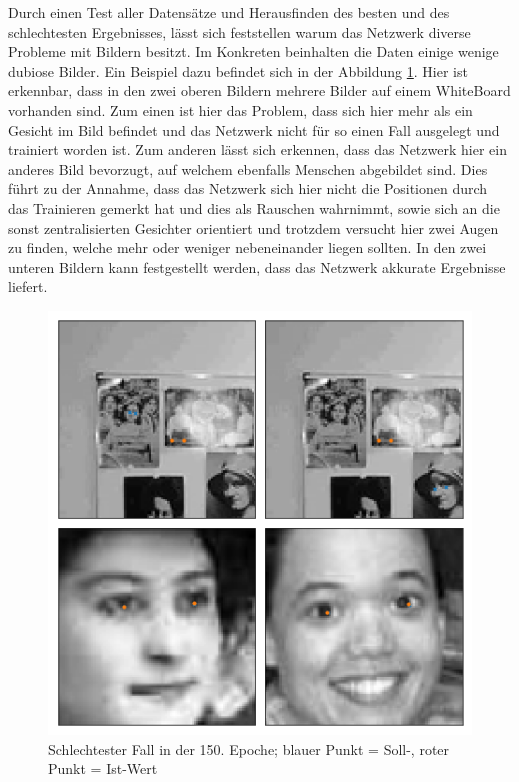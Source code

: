\noindent
Durch einen Test aller Datensätze und Herausfinden des besten und des schlechtesten Ergebnisses, lässt sich feststellen warum das Netzwerk diverse Probleme mit Bildern besitzt. 
Im Konkreten beinhalten die Daten einige wenige dubiose Bilder. 
Ein Beispiel dazu befindet sich in der Abbildung \ref{fig:dubio}. 
Hier ist erkennbar, dass in den zwei oberen Bildern mehrere Bilder auf einem WhiteBoard vorhanden sind. 
Zum einen ist hier das Problem, dass sich hier mehr als ein Gesicht im Bild befindet und das Netzwerk nicht für so einen Fall ausgelegt und trainiert worden ist. 
Zum anderen lässt sich erkennen, dass das Netzwerk hier ein anderes Bild bevorzugt, auf welchem ebenfalls Menschen abgebildet sind. 
Dies führt zu der Annahme, dass das Netzwerk sich hier nicht die Positionen durch das Trainieren gemerkt hat und dies als Rauschen wahrnimmt, sowie sich an die sonst zentralisierten Gesichter orientiert und trotzdem versucht hier zwei Augen zu finden, welche mehr oder weniger nebeneinander liegen sollten. 
In den zwei unteren Bildern kann festgestellt werden, dass das Netzwerk akkurate Ergebnisse liefert. 
\begin{figure}[ht!]
	\centering
	\includegraphics[scale=0.6]{images/Bad_2.png}
	\caption{Schlechtester Fall in der 150. Epoche; blauer Punkt = Soll-, roter Punkt = Ist-Wert}
	\label{fig:dubio}
\end{figure} \phantom \newline

